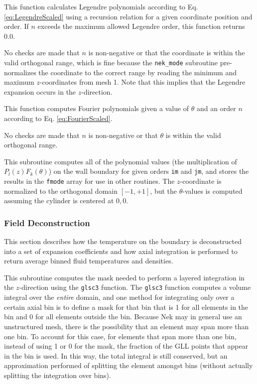 \documentclass[10pt]{article}
\newcounter{subsubsubsection}[subsubsection]
\numberwithin{equation}{section} %
\begin{document}
This function calculates Legendre polynomials according to Eq. \eqref{eq:LegendreScaled} using a recursion relation for a given coordinate position and order. If \(n\) exceeds the maximum allowed Legendre order, this function returns 0.0.

\color{magenta}
No checks are made that \(n\) is non-negative or that the coordinate is within the valid orthogonal range, which is fine because the {\tt nek\_mode} subroutine pre-normalizes the coordinate to the correct range by reading the minimum and maximum \(z\)-coordinates from mesh 1. Note that this implies that the Legendre expansion occurs in the \(z\)-direction.
\color{black}

This function computes Fourier polynomials given a value of \(\theta\) and an order \(n\) according to Eq. \eqref{eq:FourierScaled}. 

\color{magenta}
No checks are made that \(n\) is non-negative or that \(\theta\) is within the valid orthogonal range.
\color{black}

This subroutine computes all of the polynomial values (the multiplication of \(P_l(z)F_k(\theta)\)) on the wall boundary for given orders {\tt im} and {\tt jm}, and stores the results in the {\tt fmode} array for use in other routines. The \(z\)-coordinate is normalized to the orthogonal domain \([-1, +1]\), but the \(\theta\)-values is computed assuming the cylinder is centered at \(0, 0\). 

\subsubsection{Field Deconstruction}
This section describes how the temperature on the boundary is deconstructed into a set of expansion coefficients and how axial integration is performed to return average binned fluid temperatures and densities. 

This subroutine computes the mask needed to perform a layered integration in the \(z\)-direction using the {\tt glsc3} function. The {\tt glsc3} function computes a volume integral over the {\it entire} domain, and one method for integrating only over a certain axial bin is to define a mask for that bin that is 1 for all elements in the bin and 0 for all elements outside the bin. Because Nek may in general use an unstructured mesh, there is the possibility that an element may span more than one bin. To account for this case, for elements that span more than one bin, instead of using 1 or 0 for the mask, the fraction of the GLL points that appear in the bin is used. In this way, the total integral is still conserved, but an approximation performed of splitting the element amongst bins (without actually splitting the integration over bins). 
\end{document}
